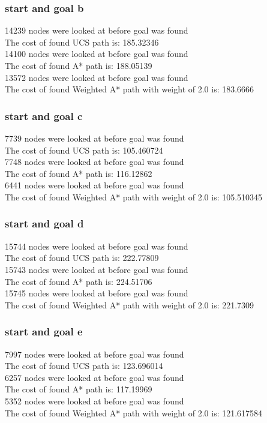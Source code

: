 \documentclass[11pt]{article} %
\begin{document}
\subsubsection{start and goal b}
14239 nodes were looked at before goal was found\\
The cost of found UCS path is: 185.32346\\
14100 nodes were looked at before goal was found\\
The cost of found A* path is: 188.05139\\
13572 nodes were looked at before goal was found\\
The cost of found Weighted A* path with weight of 2.0 is: 183.6666\\
\subsubsection{start and goal c}
7739 nodes were looked at before goal was found\\
The cost of found UCS path is: 105.460724\\
7748 nodes were looked at before goal was found\\
The cost of found A* path is: 116.12862\\
6441 nodes were looked at before goal was found\\
The cost of found Weighted A* path with weight of 2.0 is: 105.510345\\
\subsubsection{start and goal d}
15744 nodes were looked at before goal was found\\
The cost of found UCS path is: 222.77809\\
15743 nodes were looked at before goal was found\\
The cost of found A* path is: 224.51706\\
15745 nodes were looked at before goal was found\\
The cost of found Weighted A* path with weight of 2.0 is: 221.7309\\
\subsubsection{start and goal e}
7997 nodes were looked at before goal was found\\
The cost of found UCS path is: 123.696014\\
6257 nodes were looked at before goal was found\\
The cost of found A* path is: 117.19969\\
5352 nodes were looked at before goal was found\\
The cost of found Weighted A* path with weight of 2.0 is: 121.617584\\
\end{document}
